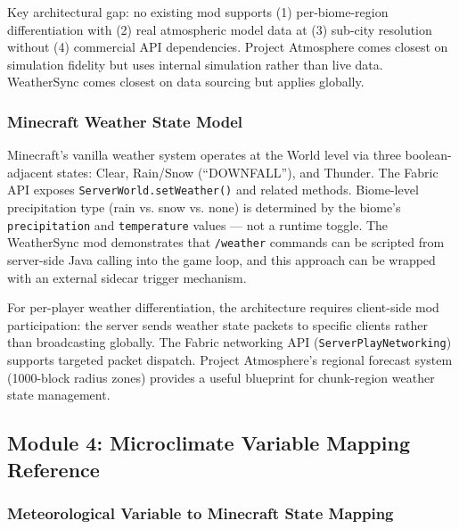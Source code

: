 \documentclass[11pt,letterpaper]{article}
\begin{document}
Key architectural gap: no existing mod supports (1) per-biome-region differentiation with (2) real atmospheric model data at (3) sub-city resolution without (4) commercial API dependencies. Project Atmosphere comes closest on simulation fidelity but uses internal simulation rather than live data. WeatherSync comes closest on data sourcing but applies globally.

\subsubsection{Minecraft Weather State Model}

Minecraft's vanilla weather system operates at the World level via three boolean-adjacent states: Clear, Rain/Snow (``DOWNFALL''), and Thunder. The Fabric API exposes \texttt{ServerWorld.setWeather()} and related methods. Biome-level precipitation type (rain vs. snow vs. none) is determined by the biome's \texttt{precipitation} and \texttt{temperature} values --- not a runtime toggle. The WeatherSync mod demonstrates that \texttt{/weather} commands can be scripted from server-side Java calling into the game loop, and this approach can be wrapped with an external sidecar trigger mechanism.

For per-player weather differentiation, the architecture requires client-side mod participation: the server sends weather state packets to specific clients rather than broadcasting globally. The Fabric networking API (\texttt{ServerPlayNetworking}) supports targeted packet dispatch. Project Atmosphere's regional forecast system (1000-block radius zones) provides a useful blueprint for chunk-region weather state management.

\subsection{Module 4: Microclimate Variable Mapping Reference}

\subsubsection{Meteorological Variable to Minecraft State Mapping}
\end{document}
